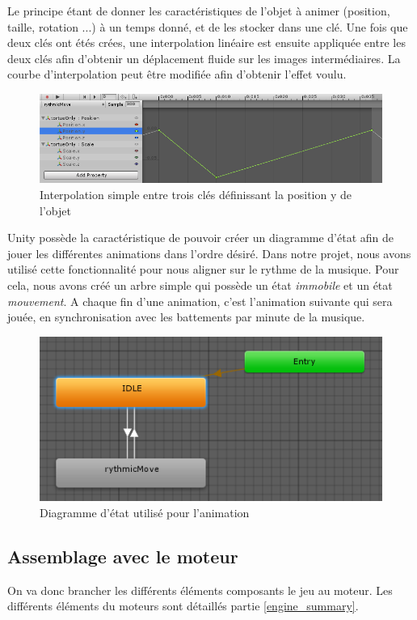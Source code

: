 Le principe étant de donner les caractéristiques de l'objet à animer (position, taille, rotation ...) à un temps donné, et de les stocker dans une clé. Une fois que deux clés ont étés crées, une interpolation linéaire est ensuite appliquée entre les deux clés afin d'obtenir un déplacement fluide sur les images intermédiaires. La courbe d'interpolation peut être modifiée afin d'obtenir l'effet voulu.

\begin{figure}[H]\centering
  \includegraphics[scale=.55]{./img/technique_animation2.png}
  \caption{Interpolation simple entre trois clés définissant la position y de l'objet}
  \label{technique_animation2}
\end{figure}

Unity possède la caractéristique de pouvoir créer un diagramme d'état afin de jouer les différentes animations dans l'ordre désiré. Dans notre projet, nous avons utilisé cette fonctionnalité pour nous aligner sur le rythme de la musique. Pour cela, nous avons créé un arbre simple qui possède un état \textit{immobile} et un état \textit{mouvement}. A chaque fin d'une animation, c'est l'animation suivante qui sera jouée, en synchronisation avec les battements par minute de la musique.

\begin{figure}[H]\centering
  \includegraphics[scale=.55]{./img/technique_animation3.png}
  \caption{Diagramme d'état utilisé pour l'animation}
  \label{technique_animation3}
\end{figure}

\subsection{Assemblage avec le moteur}
On va donc brancher les différents éléments composants le jeu au moteur. Les différents éléments du moteurs sont détaillés partie \ref{engine_summary}.

